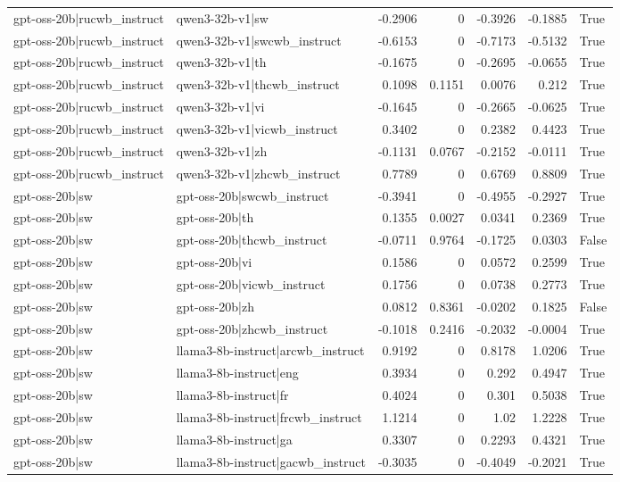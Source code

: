 \begin{table}
\begin{tabular}{l l r r r r l}
gpt-oss-20b|rucwb_instruct & qwen3-32b-v1|sw & -0.2906 & 0 & -0.3926 & -0.1885 & True \\
gpt-oss-20b|rucwb_instruct & qwen3-32b-v1|swcwb_instruct & -0.6153 & 0 & -0.7173 & -0.5132 & True \\
gpt-oss-20b|rucwb_instruct & qwen3-32b-v1|th & -0.1675 & 0 & -0.2695 & -0.0655 & True \\
gpt-oss-20b|rucwb_instruct & qwen3-32b-v1|thcwb_instruct & 0.1098 & 0.1151 & 0.0076 & 0.212 & True \\
gpt-oss-20b|rucwb_instruct & qwen3-32b-v1|vi & -0.1645 & 0 & -0.2665 & -0.0625 & True \\
gpt-oss-20b|rucwb_instruct & qwen3-32b-v1|vicwb_instruct & 0.3402 & 0 & 0.2382 & 0.4423 & True \\
gpt-oss-20b|rucwb_instruct & qwen3-32b-v1|zh & -0.1131 & 0.0767 & -0.2152 & -0.0111 & True \\
gpt-oss-20b|rucwb_instruct & qwen3-32b-v1|zhcwb_instruct & 0.7789 & 0 & 0.6769 & 0.8809 & True \\
gpt-oss-20b|sw & gpt-oss-20b|swcwb_instruct & -0.3941 & 0 & -0.4955 & -0.2927 & True \\
gpt-oss-20b|sw & gpt-oss-20b|th & 0.1355 & 0.0027 & 0.0341 & 0.2369 & True \\
gpt-oss-20b|sw & gpt-oss-20b|thcwb_instruct & -0.0711 & 0.9764 & -0.1725 & 0.0303 & False \\
gpt-oss-20b|sw & gpt-oss-20b|vi & 0.1586 & 0 & 0.0572 & 0.2599 & True \\
gpt-oss-20b|sw & gpt-oss-20b|vicwb_instruct & 0.1756 & 0 & 0.0738 & 0.2773 & True \\
gpt-oss-20b|sw & gpt-oss-20b|zh & 0.0812 & 0.8361 & -0.0202 & 0.1825 & False \\
gpt-oss-20b|sw & gpt-oss-20b|zhcwb_instruct & -0.1018 & 0.2416 & -0.2032 & -0.0004 & True \\
gpt-oss-20b|sw & llama3-8b-instruct|arcwb_instruct & 0.9192 & 0 & 0.8178 & 1.0206 & True \\
gpt-oss-20b|sw & llama3-8b-instruct|eng & 0.3934 & 0 & 0.292 & 0.4947 & True \\
gpt-oss-20b|sw & llama3-8b-instruct|fr & 0.4024 & 0 & 0.301 & 0.5038 & True \\
gpt-oss-20b|sw & llama3-8b-instruct|frcwb_instruct & 1.1214 & 0 & 1.02 & 1.2228 & True \\
gpt-oss-20b|sw & llama3-8b-instruct|ga & 0.3307 & 0 & 0.2293 & 0.4321 & True \\
gpt-oss-20b|sw & llama3-8b-instruct|gacwb_instruct & -0.3035 & 0 & -0.4049 & -0.2021 & True \\

\end{tabular}
\end{table}

